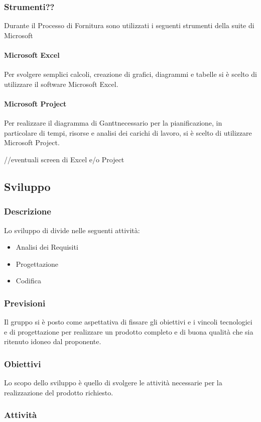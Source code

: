\subsubsection{Strumenti??}
Durante il Processo di Fornitura sono utilizzati i seguenti strumenti della suite di Microsoft
\paragraph{Microsoft Excel}
Per svolgere semplici calcoli, creazione di grafici, diagrammi e tabelle si è scelto di utilizzare il software Microsoft Excel.
\paragraph{Microsoft Project}
Per realizzare il diagramma di Gantt\glosp necessario per la pianificazione, in particolare di tempi, risorse e analisi dei carichi di lavoro, si è scelto di utilizzare Microsoft Project.

//eventuali screen di Excel e/o Project

\subsection{Sviluppo}
\subsubsection{Descrizione}
Lo sviluppo di divide nelle seguenti attività:
\begin{itemize}
	\item Analisi dei Requisiti
	\item Progettazione
	\item Codifica
\end{itemize}
\subsubsection{Previsioni}
Il gruppo si è posto come aspettativa di fissare gli obiettivi e i vincoli tecnologici e di progettazione per realizzare un prodotto completo e di buona qualità che sia ritenuto idoneo dal proponente.
\subsubsection{Obiettivi}
Lo scopo dello sviluppo è quello di svolgere le attività necessarie per la realizzazione del prodotto richiesto.

\subsubsection{Attività}
